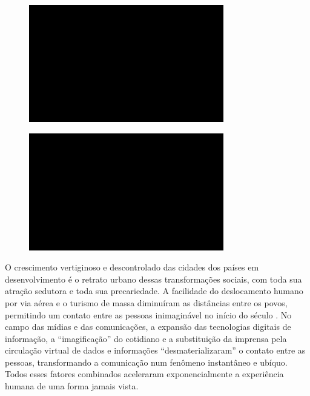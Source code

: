 \begin{figure}[!ht]

\centering
 \includegraphics[width=85mm]{./imgs/im1.jpg}
\caption{\tiny{}}

\end{figure}

\begin{figure}[!ht]

\centering
 \includegraphics[width=85mm]{./imgs/im1.jpg}
\caption{\tiny{}}

\end{figure}

O crescimento vertiginoso e descontrolado das cidades dos países em
desenvolvimento é o retrato urbano dessas transformações sociais, com
toda sua atração sedutora e toda sua precariedade. A facilidade do
deslocamento humano por via aérea e o turismo de massa diminuíram as
distâncias entre os povos, permitindo um contato entre as pessoas
inimaginável no início do século . No campo das mídias e das
comunicações, a expansão das tecnologias digitais de informação, a
``imagificação'' do cotidiano e a substituição da imprensa pela
circulação virtual de dados e informações ``desmaterializaram'' o
contato entre as pessoas, transformando a comunicação num fenômeno
instantâneo e ubíquo. Todos esses fatores combinados aceleraram
exponencialmente a experiência humana de uma forma jamais vista.

